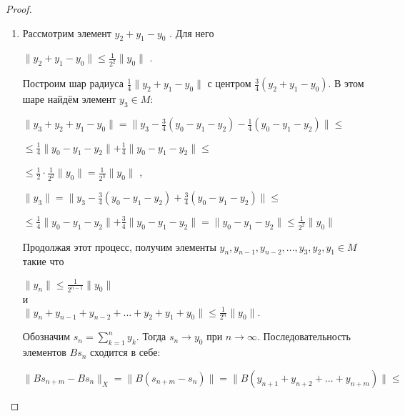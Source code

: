 \documentclass[12pt,a4paper,titlepage, oneside]{book}
\theoremstyle{definition}
\theoremstyle{plain}
\theoremstyle{remark}
\theoremstyle{remark}
\theoremstyle{remark}
\theoremstyle{plain}
\theoremstyle{plain}
\begin{document}
\begin{proof}
\begin{enumerate}
	\item Рассмотрим элемент $y_2+y_1- y_0$ . Для него 	\begin{center}	
	$\parallel y_2+y_1- y_0 \parallel \leq
	\frac{1}{2^2} \parallel y_0 \parallel$ .
	\end{center}
	Построим шар радиуса
	$\frac{1}{4} \parallel y_2 + y_1 - y_0 \parallel$      	с центром $\frac{3}{4}(y_2 + y_1 - y_0)$.
	В этом шаре найдём элемент 	$y_3 \in M$:
	\begin{center}
	$\parallel y_3 + y_2 + y_1 - y_0 \parallel =
	\parallel y_3 - \frac{3}{4}(y_0 - y_1 - y_2) -
	\frac{1}{4}(y_0 - y_1 - y_2) \parallel \leq $
	\end{center}
	\begin{center}
	$\leq \frac{1}{4} \parallel y_0 - y_1 - y_2 \parallel +
	\frac{1}{4} \parallel y_0 - y_1 - y_2 \parallel 			\leq $
	\end{center}
	\begin{center}
	$ \leq\frac{1}{2} \cdot
	\frac{1}{2^2} \parallel y_0 \parallel =
	\frac{1}{2^3} \parallel y_0 \parallel$ ,
	\end{center}
	\begin{center}
	$\parallel y_3 \parallel =
	\parallel y_3 - \frac{3}{4}(y_0 - y_1 - y_2) +
	\frac{3}{4}(y_0 - y_1 - y_2) \parallel \leq $
	\end{center}
	\begin{center}
	$\leq \frac{1}{4} \parallel y_0 - y_1 - y_2 				\parallel +
	\frac{3}{4} \parallel y_0 - y_1 - y_2 \parallel =
	 \parallel y_0 - y_1 - y_2 \parallel \leq
	 \frac{1}{2^2} \parallel y_0 \parallel$
	\end{center}

Продолжая этот процесс, получим элементы $y_n, y_{n-1}, y_{n-2}, ..., y_3, y_2, y_1 \in M$ такие что 

\begin{center}
$\lVert y_n \rVert \leq \frac{1}{2^{n-1}} \lVert y_0 \rVert$\\
и\\
$\lVert y_n + y_{n-1}+y_{n-2}+...+y_2+y_1+y_0 \rVert \leq \frac{1}{2^n} \lVert y_0 \rVert.$
\end{center}

Обозначим $s_n= \sum\limits_{k=1}^n y_k$. Тогда $s_n \to y_0$ при $n \to \infty$. Последовательность элементов $B s_n$ сходится в себе:

\begin{center}
$ \lVert B s_{n+m}-B s_n \rVert _X = \lVert B(s_{n+m}-s_n) \rVert= \lVert B(y_{n+1}+y_{n+2}+...+y_{n+m}) \rVert \leq $
\end{center}


\end{enumerate}
\end{proof}
\end{document}
